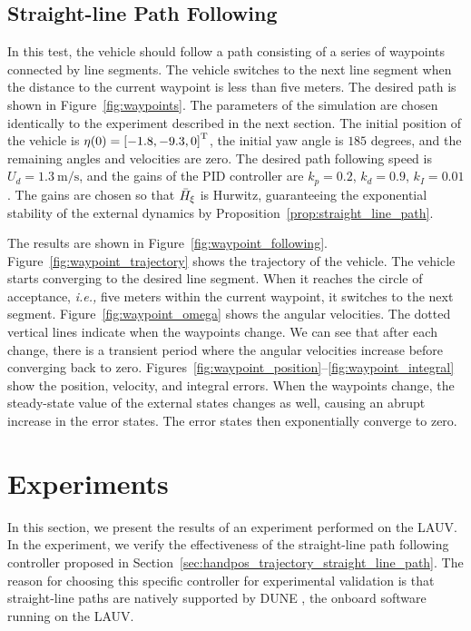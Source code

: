 \subsection{Straight-line Path Following}
\label{sec:handpos_trajectory_simulation_waypoints}

In this test, the vehicle should follow a path consisting of a series of waypoints connected by line segments.
The vehicle switches to the next line segment when the distance to the current waypoint is less than five meters.
The desired path is shown in Figure~\ref{fig:waypoints}.
The parameters of the simulation are chosen identically to the experiment described in the next section.
The initial position of the vehicle is $\eta(0) = \left[-1.8, -9.3, 0\right]^{\mathrm{T}}$, the initial yaw angle is $185$ degrees, and the remaining angles and velocities are zero.
The desired path following speed is $U_d = \SI{1.3}{\meter\per\second}$, and the gains of the PID controller are $k_p = 0.2$, $k_d = 0.9$, $k_I = 0.01$.
The gains are chosen so that $\Bar{H}_{\xi}$ is Hurwitz, guaranteeing the exponential stability of the external dynamics by Proposition~\ref{prop:straight_line_path}.

The results are shown in Figure~\ref{fig:waypoint_following}.
Figure~\ref{fig:waypoint_trajectory} shows the trajectory of the vehicle.
The vehicle starts converging to the desired line segment.
When it reaches the circle of acceptance, \emph{i.e.,} five meters within the current waypoint, it switches to the next segment.
Figure~\ref{fig:waypoint_omega} shows the angular velocities.
The dotted vertical lines indicate when the waypoints change.
We can see that after each change, there is a transient period where the angular velocities increase before converging back to zero.
Figures~\ref{fig:waypoint_position}--\ref{fig:waypoint_integral} show the position, velocity, and integral errors.
When the waypoints change, the steady-state value of the external states changes as well, causing an abrupt increase in the error states.
The error states then exponentially converge to zero.

\section{Experiments}
\label{sec:handpos_trajectory_experiments}

In this section, we present the results of an experiment performed on the LAUV.
In the experiment, we verify the effectiveness of the straight-line path following controller proposed in Section~\ref{sec:handpos_trajectory_straight_line_path}.
The reason for choosing this specific controller for experimental validation is that straight-line paths are natively supported by DUNE \cite{dune}, the onboard software running on the LAUV.

